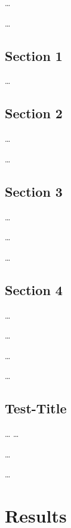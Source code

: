 \dots

\dots


\section{Section 1}
\label{ch:Methods:sec:Section1}

\dots


\section{Section 2}
\label{ch:Methods:sec:Section2}

\dots

\dots


\section{Section 3}
\label{ch:Methods:sec:Section3}

\dots

\dots

\dots


\section{Section 4}
\label{ch:Methods:sec:Section4}

\dots

\dots

\newpage

\dots

\dots

\section{Test-Title}
\label{ch:Methods:sec:Section5}

\dots
\newpage
\dots

\dots

\dots

\chapter{Results}
\label{ch:Results}

